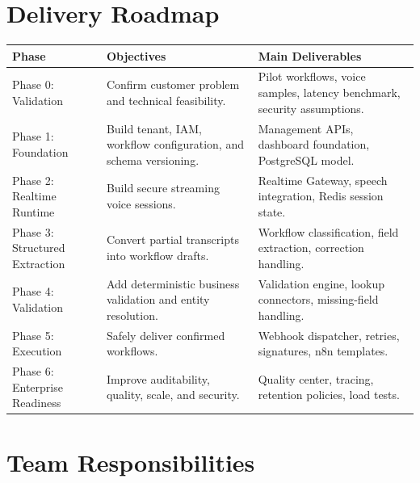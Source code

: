 \documentclass[11pt,a4paper]{article}
\begin{document}
\section{Delivery Roadmap}

\begin{tabularx}{\textwidth}{L{28mm}Y Y}
\toprule
\textbf{Phase} & \textbf{Objectives} & \textbf{Main Deliverables} \\
\midrule
Phase 0:
Validation
&
Confirm customer problem and technical feasibility.
&
Pilot workflows, voice samples, latency benchmark, security assumptions. \\

Phase 1:
Foundation
&
Build tenant, IAM, workflow configuration, and schema versioning.
&
Management APIs, dashboard foundation, PostgreSQL model. \\

Phase 2:
Realtime Runtime
&
Build secure streaming voice sessions.
&
Realtime Gateway, speech integration, Redis session state. \\

Phase 3:
Structured Extraction
&
Convert partial transcripts into workflow drafts.
&
Workflow classification, field extraction, correction handling. \\

Phase 4:
Validation
&
Add deterministic business validation and entity resolution.
&
Validation engine, lookup connectors, missing-field handling. \\

Phase 5:
Execution
&
Safely deliver confirmed workflows.
&
Webhook dispatcher, retries, signatures, n8n templates. \\

Phase 6:
Enterprise Readiness
&
Improve auditability, quality, scale, and security.
&
Quality center, tracing, retention policies, load tests. \\
\bottomrule
\end{tabularx}

\section{Team Responsibilities}
\end{document}
